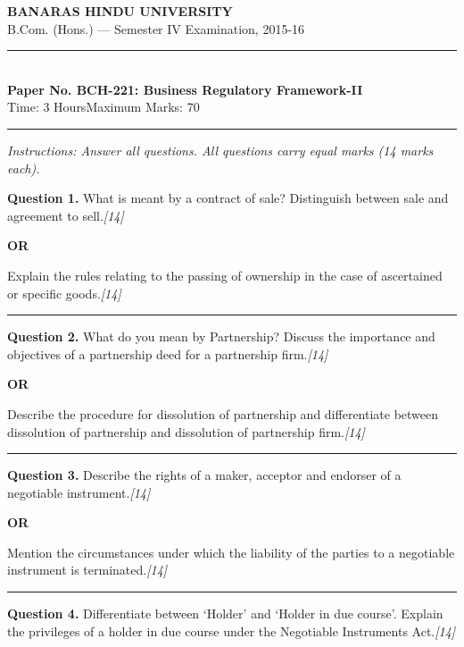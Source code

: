 \documentclass[11pt,a4paper]{article}
\newcommand{\pts}[1]{\hfill   \textit{[#1]}}
\begin{document}
\begin{center}
  {\large\bfseries BANARAS HINDU UNIVERSITY}\\[2pt]
  {\normalsize B.Com. (Hons.) --- Semester IV Examination, 2015-16}\\[6pt]
  \rule{0.8\linewidth}{0.5pt}\\[6pt]
  {\large\bfseries Paper No. BCH-221: Business Regulatory Framework-II}\\[4pt]
  {\normalsize Time: 3 Hours\hfill Maximum Marks: 70}
\end{center}

\rule{\linewidth}{0.4pt}

\smallskip



\noindent   \textit{Instructions: Answer all questions. All questions carry equal marks (14 marks each).}

\bigskip




\noindent   \textbf{Question 1.}
What is meant by a contract of sale? Distinguish between sale and agreement to sell.\pts{14}

\centerline{   \textbf{OR}}

Explain the rules relating to the passing of ownership in the case of ascertained or specific goods.\pts{14}

\medskip\rule{\linewidth}{0.2pt}




\noindent   \textbf{Question 2.}
What do you mean by Partnership? Discuss the importance and objectives of a partnership deed for a partnership firm.\pts{14}

\centerline{   \textbf{OR}}

Describe the procedure for dissolution of partnership and differentiate between dissolution of partnership and dissolution of partnership firm.\pts{14}

\medskip\rule{\linewidth}{0.2pt}




\noindent   \textbf{Question 3.}
Describe the rights of a maker, acceptor and endorser of a negotiable instrument.\pts{14}

\centerline{   \textbf{OR}}

Mention the circumstances under which the liability of the parties to a negotiable instrument is terminated.\pts{14}

\medskip\rule{\linewidth}{0.2pt}




\noindent   \textbf{Question 4.}
Differentiate between `Holder' and `Holder in due course'. Explain the privileges of a holder in due course under the Negotiable Instruments Act.\pts{14}
\end{document}
